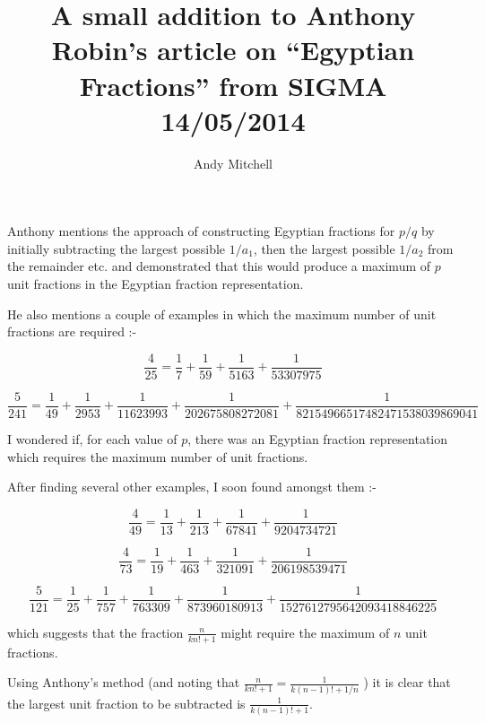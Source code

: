 \documentclass[a4paper,10pt]{article}
\author{Andy Mitchell}
\title{A small addition to Anthony Robin's article on ``Egyptian Fractions'' from SIGMA 14/05/2014}
\begin{document}
 
\maketitle 
\begin{flushleft}

\thispagestyle{empty}
Anthony mentions the approach of constructing Egyptian fractions for $p/q$ by initially subtracting the largest possible $1/a_1$, then the largest possible  $1/a_2$ from the remainder etc. and demonstrated that this would produce a maximum of $p$ unit fractions in the Egyptian fraction representation.

He also mentions a couple of examples in which the maximum number of unit fractions are required :-

\begin{equation*} 
\frac{4}{25} = \frac{1}{7} + \frac{1}{59} +  \frac{1}{5163} +  \frac{1}{53307975} 
\end{equation*}

\begin{equation*} 
\frac{5}{241} = \frac{1}{49} + \frac{1}{2953} +  \frac{1}{11623993} +  \frac{1}{202675808272081} +  \frac{1}{82154966517482471538039869041} 
\end{equation*}

I wondered if, for each value of $p$, there was an Egyptian fraction representation which requires the maximum number of unit fractions.

After finding several other examples, I soon found amongst them :-

\begin{equation*} 
\frac{4}{49} = \frac{1}{13} + \frac{1}{213} +  \frac{1}{67841} +  \frac{1}{9204734721} 
\end{equation*}

\begin{equation*}
\frac{4}{73} = \frac{1}{19} + \frac{1}{463} +  \frac{1}{321091} +  \frac{1}{206198539471} 
\end{equation*}

\begin{equation*} 
\frac{5}{121} = \frac{1}{25} + \frac{1}{757} +  \frac{1}{763309} +  \frac{1}{873960180913} +  \frac{1}{1527612795642093418846225} 
\end{equation*} 

which suggests that the fraction $\frac{n}{kn!+1}$ might require the maximum of $n$ unit fractions. 

Using Anthony's method (and noting that $\frac{n}{kn!+1} = \frac{1}{k(n-1)!+1/n}$ ) it is clear that the largest unit fraction to be subtracted is $ \frac{1}{k(n-1)!+1}$. \linebreak[4]







\end{flushleft}
\end{document}
